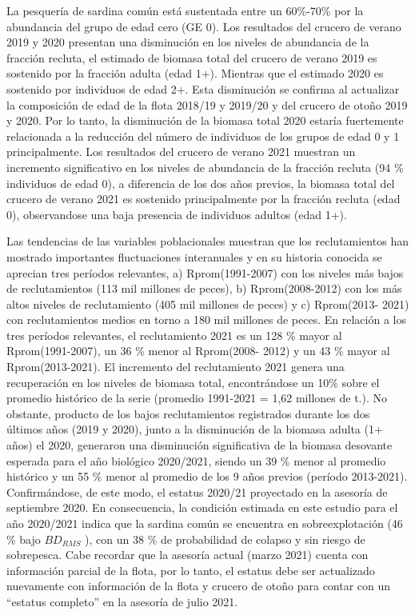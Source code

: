 \documentclass[
  spanish,
]{article}
\begin{document}
La pesquería de sardina común está sustentada entre un 60\%-70\% por la
abundancia del grupo de edad cero (GE 0). Los resultados del crucero de
verano 2019 y 2020 presentan una disminución en los niveles de
abundancia de la fracción recluta, el estimado de biomasa total del
crucero de verano 2019 es sostenido por la fracción adulta (edad 1+).
Mientras que el estimado 2020 es sostenido por individuos de edad 2+.
Esta disminución se confirma al actualizar la composición de edad de la
flota 2018/19 y 2019/20 y del crucero de otoño 2019 y 2020. Por lo
tanto, la disminución de la biomasa total 2020 estaría fuertemente
relacionada a la reducción del número de individuos de los grupos de
edad 0 y 1 principalmente. Los resultados del crucero de verano 2021
muestran un incremento significativo en los niveles de abundancia de la
fracción recluta (94 \% individuos de edad 0), a diferencia de los dos
años previos, la biomasa total del crucero de verano 2021 es sostenido
principalmente por la fracción recluta (edad 0), observandose una baja
presencia de individuos adultos (edad 1+).

Las tendencias de las variables poblacionales muestran que los
reclutamientos han mostrado importantes fluctuaciones interanuales y en
su historia conocida se aprecian tres períodos relevantes, a)
Rprom(1991-2007) con los niveles más bajos de reclutamientos (113 mil
millones de peces), b) Rprom(2008-2012) con los más altos niveles de
reclutamiento (405 mil millones de peces) y c) Rprom(2013- 2021) con
reclutamientos medios en torno a 180 mil millones de peces. En relación
a los tres períodos relevantes, el reclutamiento 2021 es un 128 \% mayor
al Rprom(1991-2007), un 36 \% menor al Rprom(2008- 2012) y un 43 \%
mayor al Rprom(2013-2021). El incremento del reclutamiento 2021 genera
una recuperación en los niveles de biomasa total, encontrándose un 10\%
sobre el promedio histórico de la serie (promedio 1991-2021 = 1,62
millones de t.). No obstante, producto de los bajos reclutamientos
registrados durante los dos últimos años (2019 y 2020), junto a la
disminución de la biomasa adulta (1+ años) el 2020, generaron una
disminución significativa de la biomasa desovante esperada para el año
biológico 2020/2021, siendo un 39 \% menor al promedio histórico y un 55
\% menor al promedio de los 9 años previos (período 2013-2021).
Confirmándose, de este modo, el estatus 2020/21 proyectado en la
asesoría de septiembre 2020. En consecuencia, la condición estimada en
este estudio para el año 2020/2021 indica que la sardina común se
encuentra en sobreexplotación (46 \% bajo \(BD_{RMS}\) ), con un 38 \%
de probabilidad de colapso y sin riesgo de sobrepesca. Cabe recordar que
la asesoría actual (marzo 2021) cuenta con información parcial de la
flota, por lo tanto, el estatus debe ser actualizado nuevamente con
información de la flota y crucero de otoño para contar con un ``estatus
completo'' en la asesoría de julio 2021.
\end{document}
